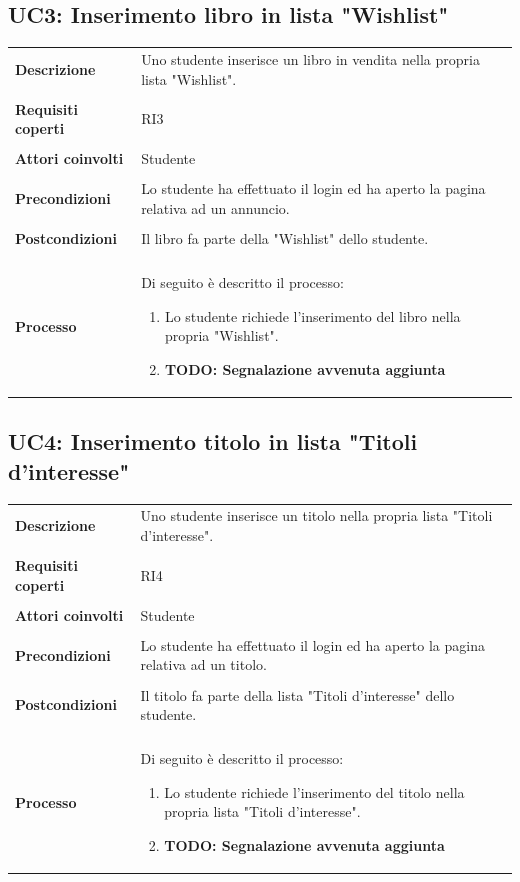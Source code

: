 \documentclass[10pt,a4paper]{report}
\begin{document}
	\subsection{UC3: Inserimento libro in lista "Wishlist"}
	\begin{tabular}{lp{}}
		\textbf{Descrizione}&Uno studente inserisce un libro in vendita nella propria lista "Wishlist".\\
		\\
		\textbf{Requisiti coperti}&RI3\\
		\\
		\textbf{Attori coinvolti}&Studente\\
		\\
		\textbf{Precondizioni}&Lo studente ha effettuato il login ed ha aperto la pagina relativa ad un annuncio.\\
		\\
		\textbf{Postcondizioni}&Il libro fa parte della "Wishlist" dello studente.\\
		\\
		\textbf{Processo}&Di seguito è descritto il processo:
		\begin{enumerate}
			\item Lo studente richiede l'inserimento del libro nella propria "Wishlist".
			\item \textbf{TODO: Segnalazione avvenuta aggiunta}
		\end{enumerate}
	\end{tabular}

	\subsection{UC4: Inserimento titolo in lista "Titoli d'interesse"}
	\begin{tabular}{lp{}}
		\textbf{Descrizione}&Uno studente inserisce un titolo nella propria lista "Titoli d'interesse".\\
		\\
		\textbf{Requisiti coperti}&RI4\\
		\\
		\textbf{Attori coinvolti}&Studente\\
		\\
		\textbf{Precondizioni}&Lo studente ha effettuato il login ed ha aperto la pagina relativa ad un titolo.\\
		\\
		\textbf{Postcondizioni}&Il titolo fa parte della lista "Titoli d'interesse" dello studente.\\
		\\
		\textbf{Processo}&Di seguito è descritto il processo:
		\begin{enumerate}
			\item Lo studente richiede l'inserimento del titolo nella propria lista "Titoli d'interesse".
			\item \textbf{TODO: Segnalazione avvenuta aggiunta}
		\end{enumerate}
	\end{tabular}
\end{document}
